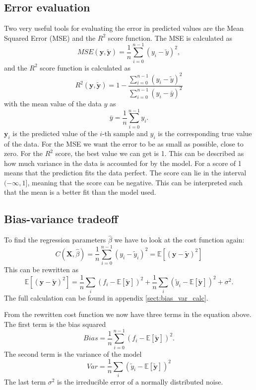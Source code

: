 \documentclass[12pt,a4paper,english]{article}
\begin{document}
\subsection{Error evaluation}
Two very useful tools for evaluating the error in predicted values are the Mean Squared Error (MSE) and the $R^2$ score function. The MSE is calculated as 
\begin{equation}
\label{eq:MSE}
MSE(\textbf{y}, \tilde{\textbf{y}})=\frac{1}{n}\sum_{i=0}^{n-1}(y_i-\tilde{y})^2,
\end{equation}
and the $R^2$ score function is calculated as
\begin{equation}
\label{eq:R2_score}
R^2(\textbf{y},\tilde{\textbf{y}})=1-\frac{\sum_{i=0}^{n-1}(y_i-\tilde{y})^2}{\sum_{i=0}^{n-1}(y_i-\bar{y})^2}
\end{equation}
with the mean value of the data $y$ as
\[\bar{y}=\frac{1}{n}\sum_{i=0}^{n-1}y_i.\]
$\textbf{y}_i$ is the predicted value of the $i$-th sample and $y_i$ is the corresponding true value of the data. For the MSE we want the error to be as small as possible, close to zero. For the $R^2$ score, the best value we can get is 1. This can be described as how much variance in the data is accounted for by the model. For a score of 1 means that the prediction fits the data perfect. The score can lie in the interval $(-\infty,1]$, meaning that the score can be negative. This can be interpreted such that the mean is a better fit than the model used.

\subsection{Bias-variance tradeoff}
To find the regression parameters $\hat{\beta}$ we have to look at the cost function again:
\begin{equation}
\label{eq:cost_func}
C(\textbf{X},\hat{\beta})=\frac{1}{n}\sum_{i=0}^{n-1}(y_i-\tilde{y}_i)^2= \mathds{E}[(\textbf{y}-\tilde{\textbf{y}})^2]
\end{equation}
This can be rewritten as 
\begin{equation}
\label{eq:bias_var}
\mathds{E}[(\textbf{y}-\tilde{\textbf{y}})^2]= \frac{1}{n}\sum_{i}(f_i-\mathds{E}[\tilde{\textbf{y}}])^2+ \frac{1}{n}\sum_{i}(\tilde{y}_i-\mathds{E}[\tilde{\textbf{y}}])^2+\sigma^2.
\end{equation}
The full calculation can be found in appendix \ref{sect:bias_var_calc}.

From the rewritten cost function we now have three terms in the equation above. The first term is the bias squared
\begin{equation}
\label{eq_Bias}
Bias=\frac{1}{n}\sum_{i=0}^{n-1}(f_i-\mathds{E}[\tilde{\textbf{y}}])^2.
\end{equation}
The second term is the variance of the model
\begin{equation}
\label{eq:var}
Var=\frac{1}{n}\sum_{i}(\tilde{y}_i-\mathds{E}[\tilde{\textbf{y}}])^2
\end{equation}
The last term $\sigma^2$ is the irreducible error of a normally distributed noise.
\end{document}
